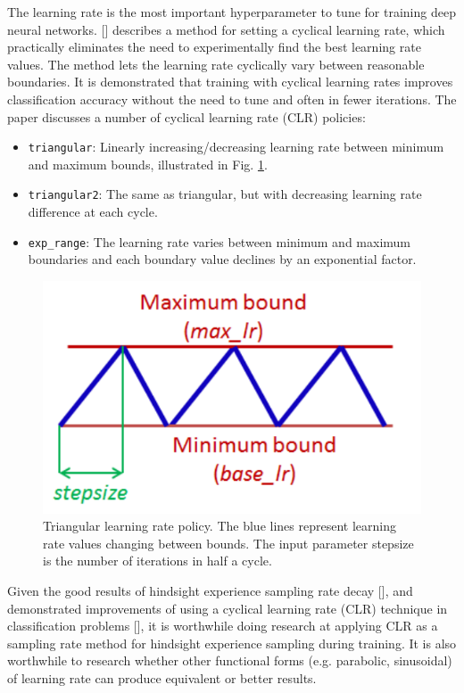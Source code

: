 \documentclass[conference]{IEEEtran}
\begin{document}
The learning rate is the most important hyperparameter to tune for training deep neural networks. [\cite{smith2017cyclical}] describes a method for setting a cyclical learning rate, which practically eliminates the need to experimentally find the best learning rate values. The method lets the learning rate cyclically vary between reasonable boundaries. It is demonstrated that training with cyclical learning rates improves classification accuracy without the need to tune and often in fewer iterations. The paper discusses a number of cyclical learning rate (CLR) policies:
\begin{itemize}
    \item \texttt{triangular}: Linearly increasing/decreasing learning rate between minimum and maximum bounds, illustrated in Fig. \ref{fig:research_clr}.
    \item \texttt{triangular2}: The same as triangular, but with decreasing learning rate difference at each cycle.
    \item \texttt{exp\_range}: The learning rate varies between minimum and maximum boundaries and each boundary value declines by an exponential factor.
\end{itemize}
\begin{figure}[ht]
\centering
\includegraphics[width=0.7\columnwidth]{img/CLR.png}
\caption{Triangular learning rate policy. The blue lines represent learning rate values changing between bounds. The input parameter stepsize is the number of iterations in half a cycle.}
\label{fig:research_clr}
\end{figure}

Given the good results of hindsight experience sampling rate decay [\cite{vecchietti2020sampling}], and demonstrated improvements of using a cyclical learning rate (CLR) technique in classification problems [\cite{smith2017cyclical}], it is worthwhile doing research at applying CLR as a sampling rate method for hindsight experience sampling during training. It is also worthwhile to research whether other functional forms (e.g. parabolic, sinusoidal) of learning rate can produce equivalent or better results.
\end{document}
